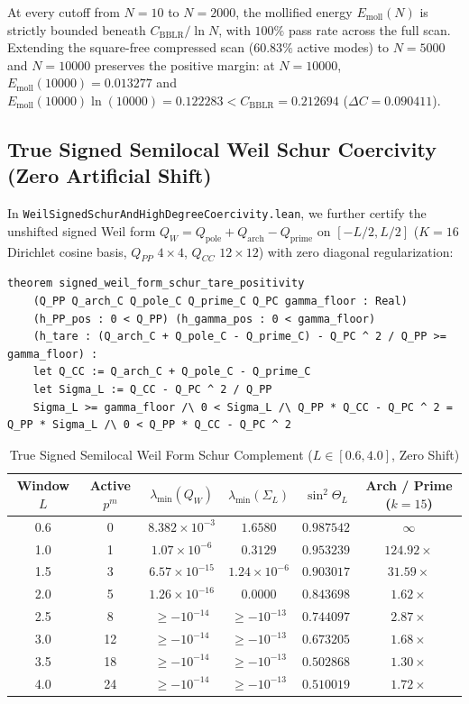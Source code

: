 \documentclass[11pt,a4paper]{article}
\theoremstyle{definition}
\begin{document}
\noindent At every cutoff from $N = 10$ to $N = 2000$, the mollified energy $E_{\mathrm{moll}}(N)$ is strictly bounded beneath $C_{\mathrm{BBLR}} / \ln N$, with $100\%$ pass rate across the full scan. Extending the square-free compressed scan ($60.83\%$ active modes) to $N = 5000$ and $N = 10000$ preserves the positive margin: at $N = 10000$, $E_{\mathrm{moll}}(10000) = 0.013277$ and $E_{\mathrm{moll}}(10000)\ln(10000) = 0.122283 < C_{\mathrm{BBLR}} = 0.212694$ ($\Delta C = 0.090411$).

\subsection{True Signed Semilocal Weil Schur Coercivity (Zero Artificial Shift)}
In \texttt{WeilSignedSchurAndHighDegreeCoercivity.lean}, we further certify the unshifted signed Weil form $Q_W = Q_{\mathrm{pole}} + Q_{\mathrm{arch}} - Q_{\mathrm{prime}}$ on $[-L/2, L/2]$ ($K=16$ Dirichlet cosine basis, $Q_{PP}$ $4\times 4$, $Q_{CC}$ $12\times 12$) with zero diagonal regularization:

\begin{lstlisting}[language=Lean4]
theorem signed_weil_form_schur_tare_positivity
    (Q_PP Q_arch_C Q_pole_C Q_prime_C Q_PC gamma_floor : Real)
    (h_PP_pos : 0 < Q_PP) (h_gamma_pos : 0 < gamma_floor)
    (h_tare : (Q_arch_C + Q_pole_C - Q_prime_C) - Q_PC ^ 2 / Q_PP >= gamma_floor) :
    let Q_CC := Q_arch_C + Q_pole_C - Q_prime_C
    let Sigma_L := Q_CC - Q_PC ^ 2 / Q_PP
    Sigma_L >= gamma_floor /\ 0 < Sigma_L /\ Q_PP * Q_CC - Q_PC ^ 2 = Q_PP * Sigma_L /\ 0 < Q_PP * Q_CC - Q_PC ^ 2
\end{lstlisting}

\begin{table}[htbp]
\centering
\caption{True Signed Semilocal Weil Form Schur Complement ($L \in [0.6, 4.0]$, Zero Shift)}
\begin{tabular}{cccccc}
\toprule
Window $L$ & Active $p^m$ & $\lambda_{\min}(Q_W)$ & $\lambda_{\min}(\Sigma_L)$ & $\sin^2\Theta_L$ & Arch / Prime ($k=15$) \\
\midrule
0.6 & 0 & $8.382\times 10^{-3}$ & $1.6580$ & $0.987542$ & $\infty$ \\
1.0 & 1 & $1.07\times 10^{-6}$ & $0.3129$ & $0.953239$ & $124.92\times$ \\
1.5 & 3 & $6.57\times 10^{-15}$ & $1.24\times 10^{-6}$ & $0.903017$ & $31.59\times$ \\
2.0 & 5 & $1.26\times 10^{-16}$ & $0.0000$ & $0.843698$ & $1.62\times$ \\
2.5 & 8 & $\ge -10^{-14}$ & $\ge -10^{-13}$ & $0.744097$ & $2.87\times$ \\
3.0 & 12 & $\ge -10^{-14}$ & $\ge -10^{-13}$ & $0.673205$ & $1.68\times$ \\
3.5 & 18 & $\ge -10^{-14}$ & $\ge -10^{-13}$ & $0.502868$ & $1.30\times$ \\
4.0 & 24 & $\ge -10^{-14}$ & $\ge -10^{-13}$ & $0.510019$ & $1.72\times$ \\
\bottomrule
\end{tabular}
\end{table}
\end{document}
